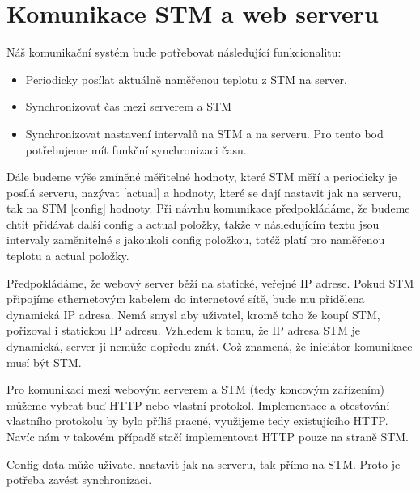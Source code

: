 \section{Komunikace STM a web serveru}

Náš komunikační systém bude potřebovat následující funkcionalitu:
\begin{itemize}
    \item Periodicky posílat aktuálně naměřenou teplotu z STM na server.
    \item Synchronizovat čas mezi serverem a STM
    \item Synchronizovat nastavení intervalů na STM a na serveru.
          Pro tento bod potřebujeme mít funkční synchronizaci času.
\end{itemize}

Dále budeme výše zmíněné měřitelné hodnoty, které STM měří a periodicky je posílá
serveru, nazývat [actual] a hodnoty, které se dají nastavit jak na serveru, tak na
STM [config] hodnoty.
Při návrhu komunikace předpokládáme, že budeme chtít přidávat další config a actual
položky, takže v následujícím textu jsou intervaly zaměnitelné s jakoukoli
config položkou, totéž platí pro naměřenou teplotu a actual položky.

Předpokládáme, že webový server běží na statické, veřejné IP adrese.
Pokud STM připojíme ethernetovým kabelem do internetové sítě, bude mu přidělena dynamická IP adresa.
Nemá smysl aby uživatel, kromě toho že koupí STM, pořizoval i statickou IP adresu.
Vzhledem k tomu, že IP adresa STM je dynamická, server ji nemůže dopředu znát.
Což znamená, že iniciátor komunikace musí být STM.

Pro komunikaci mezi webovým serverem a STM (tedy koncovým zařízením) můžeme vybrat buď HTTP nebo vlastní protokol.
Implementace a otestování vlastního protokolu by bylo příliš pracné, využijeme tedy existujícího HTTP.
Navíc nám v takovém případě stačí implementovat HTTP pouze na straně STM.


Config data může uživatel nastavit jak na serveru, tak přímo na STM.
Proto je potřeba zavést synchronizaci.

